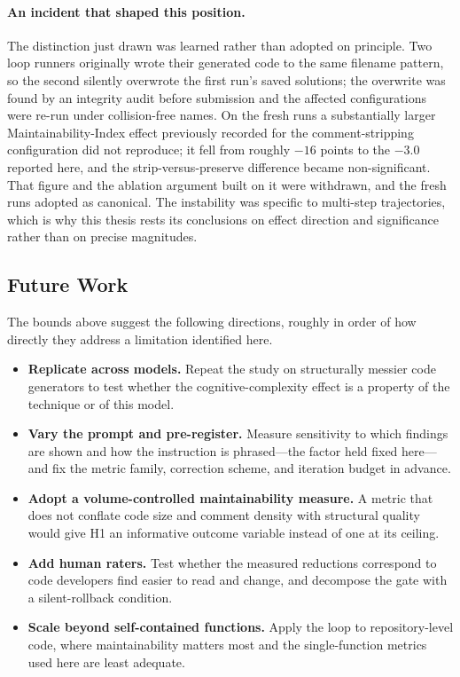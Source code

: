 \paragraph{An incident that shaped this position.} The distinction just drawn was
learned rather than adopted on principle. Two loop runners originally wrote their
generated code to the same filename pattern, so the second silently overwrote the
first run's saved solutions; the overwrite was found by an integrity audit before
submission and the affected configurations were re-run under collision-free names.
On the fresh runs a substantially larger Maintainability-Index effect previously
recorded for the comment-stripping configuration did not reproduce; it fell from roughly $-16$ points to the $-3.0$ reported here, and the strip-versus-preserve
difference became non-significant. That figure and the ablation argument built on it
were withdrawn, and the fresh runs adopted as canonical. The instability was
specific to multi-step trajectories, which is why this thesis rests its conclusions
on effect direction and significance rather than on precise magnitudes.

\subsection{Future Work}

The bounds above suggest the following directions, roughly in order of how directly
they address a limitation identified here.

\begin{itemize}
  \item \textbf{Replicate across models.} Repeat the study on structurally messier
    code generators to test whether the cognitive-complexity effect is a property of
    the technique or of this model.
  \item \textbf{Vary the prompt and pre-register.} Measure sensitivity to which
    findings are shown and how the instruction is phrased---the factor held fixed
    here---and fix the metric family, correction scheme, and iteration budget in
    advance.
  \item \textbf{Adopt a volume-controlled maintainability measure.} A metric that
    does not conflate code size and comment density with structural quality would
    give H1 an informative outcome variable instead of one at its ceiling.
  \item \textbf{Add human raters.} Test whether the measured reductions correspond
    to code developers find easier to read and change, and decompose the gate with a
    silent-rollback condition.
  \item \textbf{Scale beyond self-contained functions.} Apply the loop to
    repository-level code, where maintainability matters most and the
    single-function metrics used here are least adequate.
\end{itemize}

